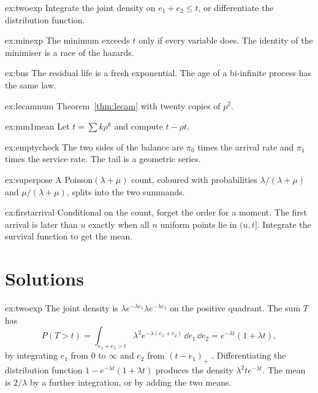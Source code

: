 \begin{hint}{ex:twoexp}
Integrate the joint density on $e_1+e_2\le t$, or differentiate the distribution function.
\end{hint}
\begin{hint}{ex:minexp}
The minimum exceeds $t$ only if every variable does. The identity of the minimiser is a race of the hazards.
\end{hint}
\begin{hint}{ex:bus}
The residual life is a fresh exponential. The age of a bi-infinite process has the same law.
\end{hint}
\begin{hint}{ex:lecamnum}
Theorem~\ref{thm:lecam} with twenty copies of $p^2$.
\end{hint}
\begin{hint}{ex:mm1mean}
Let $t=\sum k\rho^k$ and compute $t-\rho t$.
\end{hint}
\begin{hint}{ex:emptycheck}
The two sides of the balance are $\pi_0$ times the arrival rate and $\pi_1$ times the service rate. The tail is a geometric series.
\end{hint}
\begin{hint}{ex:superpose}
A Poisson$(\lambda+\mu)$ count, coloured with probabilities $\lambda/(\lambda+\mu)$ and $\mu/(\lambda+\mu)$, splits into the two summands.
\end{hint}
\begin{hint}{ex:firstarrival}
Conditional on the count, forget the order for a moment. The first arrival is later than $u$ exactly when all $n$ uniform points lie in $(u,t]$. Integrate the survival function to get the mean.
\end{hint}

\section{Solutions}

\begin{solution}{ex:twoexp}
\writeup The joint density is $\lambda e^{-\lambda e_1}\lambda e^{-\lambda e_2}$ on the positive quadrant. The sum $T$ has
\[
 P(T>t)=\int_{e_1+e_2>t}\lambda^2 e^{-\lambda(e_1+e_2)}\,\dd e_1\,\dd e_2=e^{-\lambda t}(1+\lambda t),
\]
by integrating $e_1$ from $0$ to $\infty$ and $e_2$ from $(t-e_1)_+$ . Differentiating the distribution function $1-e^{-\lambda t}(1+\lambda t)$ produces the density $\lambda^2 t e^{-\lambda t}$. The mean is $2/\lambda$ by a further integration, or by adding the two means.
\end{solution}

